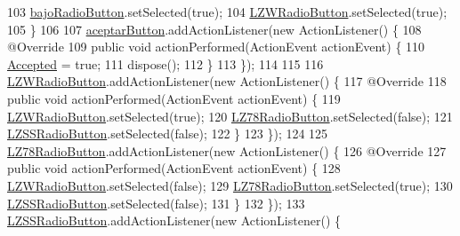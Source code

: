 \begin{DoxyCode}
103             \hyperlink{classpresentacion_1_1form_1_1PopUp__Comp_add9532658d448dcbfa9b7dd40ddc8b38}{bajoRadioButton}.setSelected(\textcolor{keyword}{true});
104             \hyperlink{classpresentacion_1_1form_1_1PopUp__Comp_a810fe251f9c88e3b83ce466feafafe2e}{LZWRadioButton}.setSelected(\textcolor{keyword}{true});
105         \}
106 
107         \hyperlink{classpresentacion_1_1form_1_1PopUp__Comp_a6321172d7f93f607a1cea6e2eee6a6ea}{aceptarButton}.addActionListener(\textcolor{keyword}{new} ActionListener() \{
108             @Override
109             \textcolor{keyword}{public} \textcolor{keywordtype}{void} actionPerformed(ActionEvent actionEvent) \{
110                 \hyperlink{classpresentacion_1_1form_1_1PopUp__Comp_af8e9310f7ff94d5a8cc917c66536bfde}{Accepted} = \textcolor{keyword}{true};
111                 dispose();
112             \}
113         \});
114 
115 
116         \hyperlink{classpresentacion_1_1form_1_1PopUp__Comp_a810fe251f9c88e3b83ce466feafafe2e}{LZWRadioButton}.addActionListener(\textcolor{keyword}{new} ActionListener() \{
117             @Override
118             \textcolor{keyword}{public} \textcolor{keywordtype}{void} actionPerformed(ActionEvent actionEvent) \{
119                 \hyperlink{classpresentacion_1_1form_1_1PopUp__Comp_a810fe251f9c88e3b83ce466feafafe2e}{LZWRadioButton}.setSelected(\textcolor{keyword}{true});
120                 \hyperlink{classpresentacion_1_1form_1_1PopUp__Comp_ac750ecbde516e2fee470693124d2ff63}{LZ78RadioButton}.setSelected(\textcolor{keyword}{false});
121                 \hyperlink{classpresentacion_1_1form_1_1PopUp__Comp_ad18c1029f04cc43d033183dca943977c}{LZSSRadioButton}.setSelected(\textcolor{keyword}{false});
122             \}
123         \});
124 
125         \hyperlink{classpresentacion_1_1form_1_1PopUp__Comp_ac750ecbde516e2fee470693124d2ff63}{LZ78RadioButton}.addActionListener(\textcolor{keyword}{new} ActionListener() \{
126             @Override
127             \textcolor{keyword}{public} \textcolor{keywordtype}{void} actionPerformed(ActionEvent actionEvent) \{
128                 \hyperlink{classpresentacion_1_1form_1_1PopUp__Comp_a810fe251f9c88e3b83ce466feafafe2e}{LZWRadioButton}.setSelected(\textcolor{keyword}{false});
129                 \hyperlink{classpresentacion_1_1form_1_1PopUp__Comp_ac750ecbde516e2fee470693124d2ff63}{LZ78RadioButton}.setSelected(\textcolor{keyword}{true});
130                 \hyperlink{classpresentacion_1_1form_1_1PopUp__Comp_ad18c1029f04cc43d033183dca943977c}{LZSSRadioButton}.setSelected(\textcolor{keyword}{false});
131             \}
132         \});
133         \hyperlink{classpresentacion_1_1form_1_1PopUp__Comp_ad18c1029f04cc43d033183dca943977c}{LZSSRadioButton}.addActionListener(\textcolor{keyword}{new} ActionListener() \{

\end{DoxyCode}
